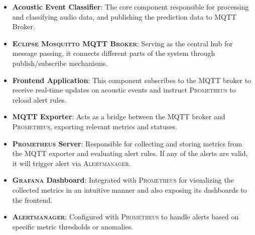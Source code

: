 \begin{itemize}
  \item \textbf{Acoustic Event Classifier}: The core component responsible for processing and classifying audio data, and publishing the prediction data to MQTT Broker.
  \item \textbf{\textsc{Eclipse Mosquitto MQTT Broker}}: Serving as the central hub for message passing, it connects different parts of the system through publish/subscribe mechanisms.
  \item \textbf{Frontend Application}: This component subscribes to the MQTT broker to receive real-time updates on acoustic events and instruct \textsc{Prometheus} to reload alert rules.
  \item \textbf{MQTT Exporter}: Acts as a bridge between the MQTT broker and \textsc{Prometheus}, exporting relevant metrics and statuses.
  \item \textbf{\textsc{Prometheus} Server}: Responsible for collecting and storing metrics from the MQTT exporter and evaluating alert rules. If any of the alerts are valid, it will trigger alert via \textsc{Alertmanager}.
  \item \textbf{\textsc{Grafana} Dashboard}: Integrated with \textsc{Prometheus} for visualizing the collected metrics in an intuitive manner and also exposing its dashboards to the frontend.
  \item \textbf{\textsc{Alertmanager}}: Configured with \textsc{Prometheus} to handle alerts based on specific metric thresholds or anomalies.
\end{itemize}

